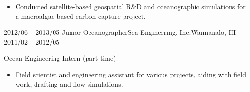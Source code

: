 \begin{experiences}
{    \begin{itemize}
        \item Conducted satellite-based geospatial R\&D and oceanographic simulations for a macroalgae-based carbon capture project.
        \end{itemize}
                    }
        {}

    \experience
    {2012/06 -- 2013/05} {Junior Oceanographer}{Sea Engineering, Inc.}{Waimanalo, HI}
    {2011/02 -- 2012/05}    {
    \normalsize{Ocean Engineering Intern (part-time)}
    \small
    
    \begin{itemize}
        \item Field scientist and engineering assistant for various projects, aiding with field work, drafting and flow simulations. 
        \end{itemize}
                    }
        {}
        
\end{experiences}
